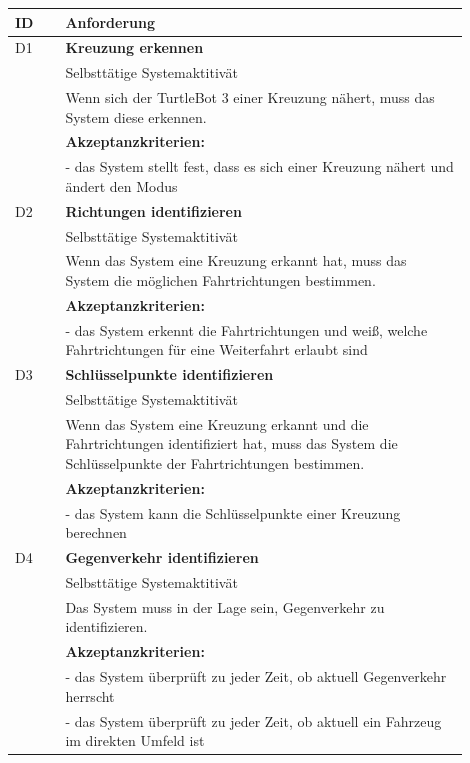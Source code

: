   \begin{table}
  
  \begin{adjustbox}{width=\textwidth}
  \begin{tabularx}{\textwidth}{@{} p{0.1\linewidth} p{0.8\linewidth} @{}}
    \textbf{ID} & \textbf{Anforderung} \\*
  \hline
    D1 & \textbf{Kreuzung erkennen} \\*
      & Selbsttätige Systemaktitivät \\*
      & Wenn sich der TurtleBot 3 einer Kreuzung nähert, muss das System diese erkennen. \\*
      & \textbf{Akzeptanzkriterien:} \\*
      & - das System stellt fest, dass es sich einer Kreuzung nähert und ändert den Modus \\
  \hline
    D2 & \textbf{Richtungen identifizieren} \\*
      & Selbsttätige Systemaktitivät \\*
      & Wenn das System eine Kreuzung erkannt hat, muss das System die möglichen Fahrtrichtungen bestimmen. \\*
      & \textbf{Akzeptanzkriterien:} \\*
      & - das System erkennt die Fahrtrichtungen und weiß, welche Fahrtrichtungen für eine Weiterfahrt erlaubt sind \\
  \hline
     D3 & \textbf{Schlüsselpunkte identifizieren} \\*
      & Selbsttätige Systemaktitivät \\*
      & Wenn das System eine Kreuzung erkannt und die Fahrtrichtungen identifiziert hat, muss das System die Schlüsselpunkte der Fahrtrichtungen bestimmen. \\*
      & \textbf{Akzeptanzkriterien:} \\*
      & - das System kann die Schlüsselpunkte einer Kreuzung berechnen \\
  \hline
     D4 & \textbf{Gegenverkehr identifizieren} \\*
      & Selbsttätige Systemaktitivät \\*
      & Das System muss in der Lage sein, Gegenverkehr zu identifizieren. \\*
      & \textbf{Akzeptanzkriterien:} \\*
      & - das System überprüft zu jeder Zeit, ob aktuell Gegenverkehr herrscht \\*    
      & - das System überprüft zu jeder Zeit, ob aktuell ein Fahrzeug im direkten Umfeld ist \\  

\end{tabularx}
\end{adjustbox}
\end{table}
